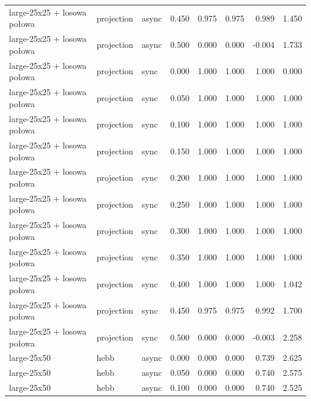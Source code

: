 \begin{tabular}{lllrrrrr}
large-25x25 + losowa połowa & projection & async & 0.450 & 0.975 & 0.975 & 0.989 & 1.450 \\

large-25x25 + losowa połowa & projection & async & 0.500 & 0.000 & 0.000 & -0.004 & 1.733 \\

large-25x25 + losowa połowa & projection & sync & 0.000 & 1.000 & 1.000 & 1.000 & 0.000 \\

large-25x25 + losowa połowa & projection & sync & 0.050 & 1.000 & 1.000 & 1.000 & 1.000 \\

large-25x25 + losowa połowa & projection & sync & 0.100 & 1.000 & 1.000 & 1.000 & 1.000 \\

large-25x25 + losowa połowa & projection & sync & 0.150 & 1.000 & 1.000 & 1.000 & 1.000 \\

large-25x25 + losowa połowa & projection & sync & 0.200 & 1.000 & 1.000 & 1.000 & 1.000 \\

large-25x25 + losowa połowa & projection & sync & 0.250 & 1.000 & 1.000 & 1.000 & 1.000 \\

large-25x25 + losowa połowa & projection & sync & 0.300 & 1.000 & 1.000 & 1.000 & 1.000 \\

large-25x25 + losowa połowa & projection & sync & 0.350 & 1.000 & 1.000 & 1.000 & 1.000 \\

large-25x25 + losowa połowa & projection & sync & 0.400 & 1.000 & 1.000 & 1.000 & 1.042 \\

large-25x25 + losowa połowa & projection & sync & 0.450 & 0.975 & 0.975 & 0.992 & 1.700 \\

large-25x25 + losowa połowa & projection & sync & 0.500 & 0.000 & 0.000 & -0.003 & 2.258 \\

large-25x50 & hebb & async & 0.000 & 0.000 & 0.000 & 0.739 & 2.625 \\

large-25x50 & hebb & async & 0.050 & 0.000 & 0.000 & 0.740 & 2.575 \\

large-25x50 & hebb & async & 0.100 & 0.000 & 0.000 & 0.740 & 2.525 \\


\end{tabular}
